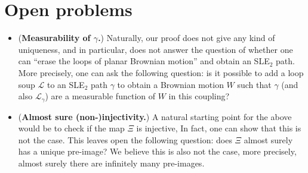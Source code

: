 \documentclass[11pt]{article}
\def\Att{{\Xi}}
\begin{document}
\section{Open problems}
\label{sec:open}
\begin{itemize}
\item (\textbf{Measurability of $\gamma$.}) Naturally, our proof does not give any kind of uniqueness, and in particular, does not answer the question of whether one can ``erase the loops of planar Brownian motion'' and obtain an SLE$_2$ path. More precisely, one can ask the following question: is it possible to add a loop soup $\mathcal{L}$ to an SLE$_2$ path $\gamma$ to obtain a Brownian motion $W$ such that $\gamma$ (and also $\mathcal{L}_\gamma$) are a measurable function of $W$ in this coupling? 

\item (\textbf{Almost sure (non-)injectivity.})  A natural starting point for the above would be to check if the map $\Att$ is injective, In fact, one can show that this is not the case. This leaves open the following question: does $\Att$ almost surely has a unique pre-image? We believe this is also not the case, more precisely, almost surely there are infinitely many pre-images. 



\end{itemize}
\end{document}
